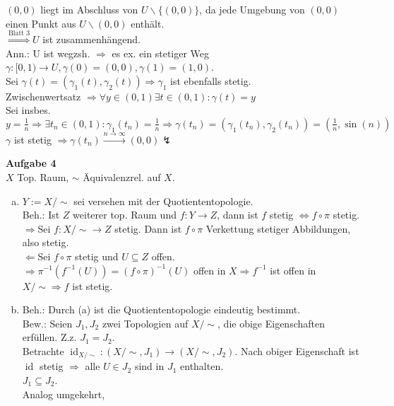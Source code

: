 \documentclass{article}
\DeclareMathOperator{\id}{id}
\begin{document}
\begin{enumerate}[(a)]
$(0,0)$ liegt im Abschluss von $U\backslash\{(0,0)\}$, da jede Umgebung von $(0,0)$ einen Punkt aus $U\backslash(0,0)$ enthält.\\
$\stackrel{\text{Blatt 3}}{\Rightarrow}U$ ist zusammenhängend.\\
Ann.: U ist wegzsh. $\Rightarrow$ es ex. ein stetiger Weg $\gamma:[0,1)\rightarrow U,\gamma(0)=(0,0),\gamma(1)=(1,0)$.\\
Sei $\gamma(t)=(\gamma_1(t),\gamma_2(t))\Rightarrow\gamma_1$ ist ebenfalls stetig.\\
Zwischenwertsatz $\Rightarrow\forall y\in(0,1)\exists t\in(0,1):\gamma(t)=y$\\
Sei insbes. $y=\frac{1}{n}\Rightarrow\exists t_n\in (0,1): \gamma_1(t_n)=\frac{1}{n}\Rightarrow\gamma(t_n)=(\gamma_1(t_n),\gamma_2(t_n))=(\frac{1}{n},\sin(n))$\\
$\gamma$ ist stetig $\Rightarrow\gamma(t_n)\stackrel{n\rightarrow\infty}{\longrightarrow}(0,0)\lightning$
\end{enumerate}

\textbf{Aufgabe 4}\\
$X$ Top. Raum, $\sim$ Äquivalenzrel. auf $X$.\begin{enumerate}[(a)]
\item $Y:=X/\sim$ sei versehen mit der Quotiententopologie.\\
Beh.: Ist $Z$ weiterer top. Raum und $f: Y\rightarrow Z$, dann ist $f$ stetig $\Leftrightarrow f\circ\pi$ stetig.
\glqq$\Rightarrow$\grqq Sei $f:X/\sim\rightarrow Z$ stetig. Dann ist $f\circ\pi$ Verkettung stetiger Abbildungen, also stetig.\\
\glqq$\Leftarrow$\grqq Sei $f\circ\pi$ stetig und $U\subseteq Z$ offen.\\
$\Rightarrow\pi^{-1}(f^{-1}(U)) = (f\circ\pi)^{-1}(U)$ offen in $X \Rightarrow f^{-1}$ ist offen in $X/\sim\Rightarrow f$ ist stetig.
\item Beh.: Durch (a) ist die Quotiententopologie eindeutig bestimmt.\\
Bew.: Seien $J_1,J_2$ zwei Topologien auf $X/\sim$, die obige Eigenschaften erfüllen. Z.z. $J_1=J_2$.\\
Betrachte $\id_{X/\sim}:(X/\sim,J_1)\rightarrow(X/\sim,J_2)$. Nach obiger Eigenschaft ist $\id$ stetig $\Rightarrow$ alle $U\in J_2$ sind in $J_1$ enthalten.\\
$J_1\subseteq J_2$.\\
Analog umgekehrt,

\end{enumerate}
\end{document}
